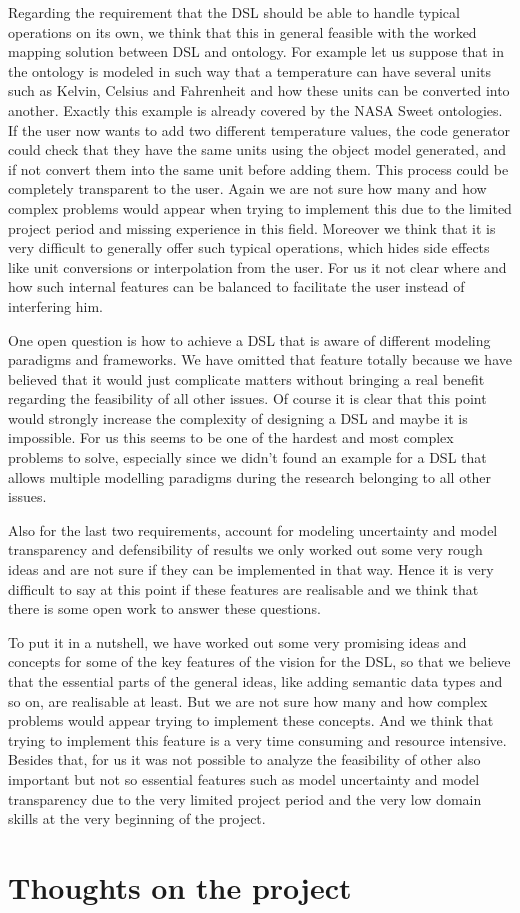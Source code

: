 \par
Regarding the requirement that the DSL should be able to handle typical operations on its own, we think that this in general feasible with the worked mapping solution between DSL and ontology. For example let us suppose that in the ontology is modeled in such way that a temperature can have several units such as Kelvin, Celsius and Fahrenheit and how these units can be converted into another. Exactly this example is already covered by the NASA Sweet ontologies. If the user now wants to add two different temperature values, the code generator could check that they have the same units using the object model generated, and if not convert them into the same unit before adding them. This process could be completely transparent to the user. Again we are not sure how many and how complex problems would appear when trying to implement this due to the limited project period and missing experience in this field. Moreover we think that it is very difficult to generally offer such typical operations, which hides side effects like unit conversions or interpolation from the user. For us it not clear where and how such internal features can be balanced to facilitate the user instead of interfering him.
\par
One open question is how to achieve a DSL that is aware of different modeling paradigms and frameworks. We have omitted that feature totally because we have believed that it would just complicate matters without bringing a real benefit regarding the feasibility of all other issues. Of course it is clear that this point would strongly increase the complexity of designing a DSL and maybe it is impossible. For us this seems to be one of the hardest and most complex problems to solve, especially since we didn’t found an example for a DSL that allows multiple modelling paradigms during the research belonging to all other issues.
\par
Also for the last two requirements, account for modeling uncertainty and model transparency and defensibility of results we only worked out some very rough ideas and are not sure if they can be implemented in that way. Hence it is very difficult to say at this point if these features are realisable and we think that there is some open work to answer these questions.
\par %
To put it in a nutshell, we have worked out some very promising ideas and concepts for some of the key features of the vision for the DSL, so that we believe that the essential parts of the general ideas, like adding semantic data types and so on, are realisable at least. But we are not sure how many and how complex problems would appear trying to implement these concepts. And we think that trying to implement this feature is a very time consuming and resource intensive. Besides that, for us it was not possible to analyze the feasibility of other also important but not so essential features such as model uncertainty and model transparency due to the very limited project period and the very low domain skills at the very beginning of the project.  

\section{Thoughts on the project}

